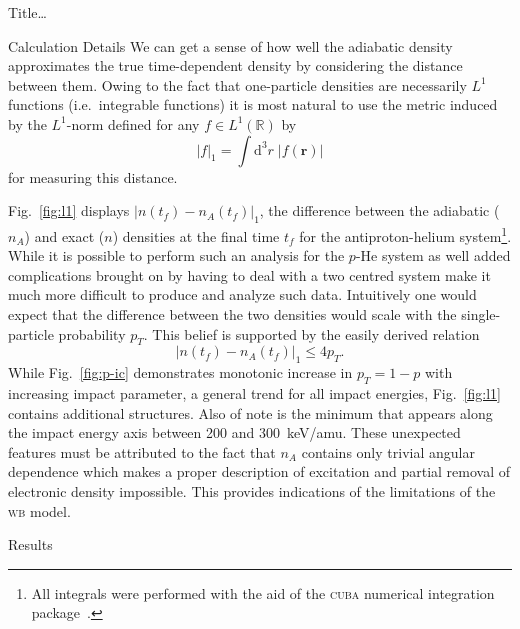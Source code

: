 \documentclass[letterpaper, 10 pt]{report}
\begin{document}
\begin{chapter}{ Title\dots \label{chap:p-he2p-he}}
\begin{section}{Calculation Details \label{sec:phe2p-det}}
      We can get a sense of how well the adiabatic density approximates the true time-dependent density
      by considering the distance between them. Owing to the fact that one-particle densities are 
      necessarily $L^1$ functions (i.e.\ integrable functions) it is most natural to use the metric
      induced by the $L^1$-norm defined for any $f \in L^1\left(\mathbb{R}\right)$ by
      \begin{equation} \label{eq:l1rorm}
         \left| f \right|_1 = \int \mathrm{d}^3 r \; \left| f(\mathbf{r}) \right|
      \end{equation}
      for measuring this distance.
      
      Fig.~\ref{fig:l1} displays $\left| n\left(t_f\right) - n_A\left(t_f\right) \right|_1$, the
      difference between the adiabatic ($n_A$) and exact ($n$) densities at the final time $t_f$ for the
      antiproton-helium system\footnote{All integrals were performed with the aid of the \textsc{cuba} 
      numerical integration package~\cite{cuba}.}. While it is possible to perform such an analysis for
      the $p$-He system as well added complications brought on by having to deal with a two centred
      system make it much more difficult to produce and analyze such data. Intuitively one would expect
      that the difference between the two densities would scale with the single-particle probability
      $p_T$. This belief is supported by the easily derived relation 
      \begin{equation} \label{eq:diff-bound}
         \left| n(t_f) - n_A(t_f) \right|_1 \leq 4 p_T.
      \end{equation}
      While Fig.~\ref{fig:p-ic} demonstrates monotonic increase in $p_T = 1 - p$ with increasing impact
      parameter, a general trend for all impact energies, Fig.~\ref{fig:l1} contains additional
      structures. Also of note is the minimum that appears along the impact energy axis between 200 and
      300~keV/amu. These unexpected features must be attributed to the fact that $n_A$ contains only
      trivial angular dependence which makes a proper description of excitation and partial removal of
      electronic density impossible. This provides indications of the limitations of the \textsc{wb}
      model.

   \end{section}

   \begin{section}{Results \label{sec:phe2p-res}}


\end{section}
\end{chapter}
\end{document}
